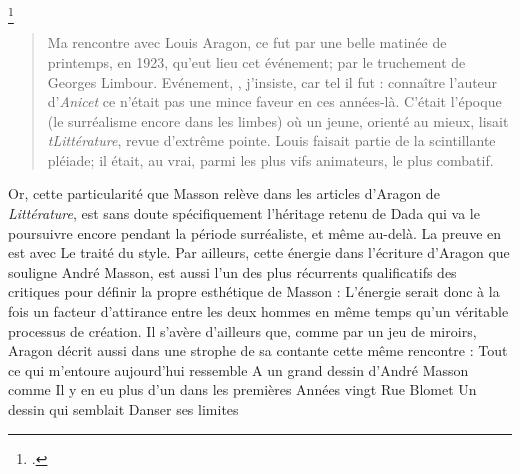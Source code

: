 \footcite[p84]{rebelle}\begin{quote} Ma rencontre avec Louis Aragon, ce fut par une belle matinée de printemps, en 1923, qu’eut lieu cet événement; par le truchement de Georges Limbour. Evénement, , j’insiste, car tel il fut : connaître l’auteur d’\emph{Anicet} ce n’était pas une mince faveur en ces années-là. C’était l’époque (le surréalisme encore dans les limbes) où un jeune, orienté au mieux, lisait \emph{tLittérature}, revue d’extrême pointe. Louis faisait partie de la scintillante pléiade; il était, au vrai, parmi les plus vifs animateurs, le plus combatif.\end{quote}

	Or, cette particularité que Masson relève dans les articles d’Aragon de \emph{Littérature}, est sans doute spécifiquement l’héritage retenu de Dada qui va le poursuivre encore pendant la période surréaliste, et même au-delà. La preuve en est avec Le traité du style. Par ailleurs, cette énergie dans l’écriture d’Aragon que souligne André Masson, est aussi l’un des plus récurrents qualificatifs des critiques pour définir la propre esthétique de Masson : L’énergie serait donc à la fois un facteur d’attirance entre les deux hommes en même temps qu’un véritable processus de création. Il s’avère d’ailleurs que, comme par un jeu de miroirs, Aragon décrit aussi dans une strophe de sa contante cette même rencontre :
Tout ce qui m’entoure aujourd’hui ressemble
A un grand dessin d’André Masson comme
Il y en eu plus d’un dans les premières
Années vingt Rue
Blomet Un dessin qui semblait
Danser ses limites

